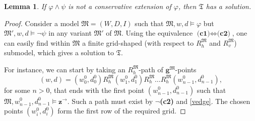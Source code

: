 \documentclass[10pt,a4paper]{amsart}
\theoremstyle{plain}
\newtheorem{lem}[thm]{Lemma}
\theoremstyle{definition}
\newcommand{\tiling}{\mathfrak T}
\newcommand{\bbvarright}{\Zvar^\to}
\newcommand{\fform}[1]{\boldsymbol{#1}}
\newcommand{\gvar}{\fform{g}}
\newcommand{\Zvar}{\fform{z}}
\begin{document}
\begin{lem}\label{lem:ifnosolthencons}
	If $\varphi \wedge \psi$ is not a conservative extension of $\varphi$, then $\tiling$ has a solution.
\end{lem}
%
\begin{proof}
	Consider a model $\mathfrak{M}=(W,D,I)$ such that $\mathfrak{M},w,d\models \varphi$ but 
	$\mathfrak{M}',w,d\models \neg\psi$
	in any variant $\mathfrak M'$ of $\mathfrak{M}$.
	Using the equivalence $\textbf{(c1)} \Leftrightarrow \textbf{(c2)}$, one can easily find within $\mathfrak{M}$ a finite grid-shaped (with respect to $R_{h}^\mathfrak M$ and 
	$R_{v}^\mathfrak M$) submodel, which gives a solution to $\tiling$. 
	
	For instance, we can start by taking an $R_{h}^\mathfrak M$-path of $\gvar^\mathfrak M$-points
	$$
	(w,d) = (w_0^0,d_0^0) R_{h}^\mathfrak M (w_1^0,d_1^0) R_{h}^\mathfrak M \dots R_{h}^\mathfrak M (w_{n-1}^0,d_{n-1}^0),
	$$
	for some $n>0$, that ends with the first point $(w_{n-1}^0,d_{n-1}^0)$ such that 
	$\mathfrak M,w_{n-1}^0,d_{n-1}^0\models \bbvarright$. Such a path must exist by $\neg$\textbf{(c2)} and \eqref{vedge}.  The chosen points $(w_i^0,d_i^0)$ form the first row of the required grid. 
	

\end{proof}
\end{document}
